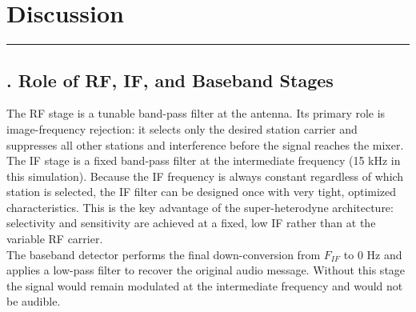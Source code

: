 \documentclass[a4paper]{article}
\begin{document}
\section*{\textcolor{DodgerBlue4}{\huge   {} Discussion}}
    \vspace{0.5cm}
    \noindent\textcolor{DeepSkyBlue4}{\rule{\textwidth}{0.05pt}}

    
    
    \subsection*{\textcolor{DodgerBlue4}{\Large {}. Role of RF, IF, and Baseband Stages}}

    
    \noindent The RF stage is a tunable band-pass filter at the antenna. Its primary role is image-frequency rejection: it selects only the desired station carrier and suppresses all other stations and interference before the signal reaches the mixer.\\
   \noindent The IF stage is a fixed band-pass filter at the intermediate frequency (15 kHz in this simulation). Because the IF frequency is always constant regardless of which station is selected, the IF filter can be designed once with very tight, optimized characteristics. This is the key advantage of the super-heterodyne architecture: selectivity and sensitivity are achieved at a fixed, low IF rather than at the variable RF carrier.\\
    The baseband detector performs the final down-conversion from $F_{IF}$ to 0 Hz and applies a low-pass filter to recover the original audio message. Without this stage the signal would remain modulated at the intermediate frequency and would not be audible.\\
    \vspace{0.4cm}
    
\end{document}
